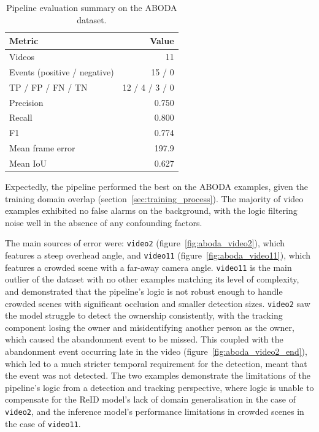 \begin{table}
	\centering
	\small
	\begin{tabularx}{\linewidth}{@{}>{\raggedright\arraybackslash}X r@{}}
		\toprule
		\textbf{Metric}              & \textbf{Value} \\
		\midrule
		Videos                       & 11             \\
		Events (positive / negative) & 15 / 0         \\
		TP / FP / FN / TN            & 12 / 4 / 3 / 0 \\
		Precision                    & 0.750          \\
		Recall                       & 0.800          \\
		F1                           & 0.774          \\
		Mean frame error             & 197.9          \\
		Mean IoU                     & 0.627          \\
		\bottomrule
	\end{tabularx}
	\caption{Pipeline evaluation summary on the ABODA dataset.}
	\label{tab:eval_aboda_summary}
\end{table}

Expectedly, the pipeline performed the best on the ABODA examples, given the
training domain overlap (section~\ref{sec:training_process}). The majority of
video examples exhibited no false alarms on the background, with the logic
filtering noise well in the absence of any confounding factors.

The main sources of error were: \texttt{video2} (figure~\ref{fig:aboda_video2}),
which features a steep overhead angle, and \texttt{video11}
(figure~\ref{fig:aboda_video11}), which features a crowded scene with a
far-away camera angle. \texttt{video11} is the main outlier of the dataset with no
other examples matching its level of complexity, and demonstrated that the
pipeline's logic is not robust enough to handle crowded scenes with significant
occlusion and smaller detection sizes. \texttt{video2} saw the model struggle to
detect the ownership consistently, with the tracking component losing the owner
and misidentifying another person as the owner, which caused the abandonment
event to be missed. This coupled with the abandonment event occurring late in
the video (figure~\ref{fig:aboda_video2_end}), which led to a much stricter
temporal requirement for the detection, meant that the event was not detected.
The two examples demonstrate the limitations of the pipeline's logic from a
detection and tracking perspective, where logic is unable to compensate for the
ReID model's lack of domain generalisation in the case of \texttt{video2}, and the
inference model's performance limitations in crowded scenes in the case of
\texttt{video11}.

